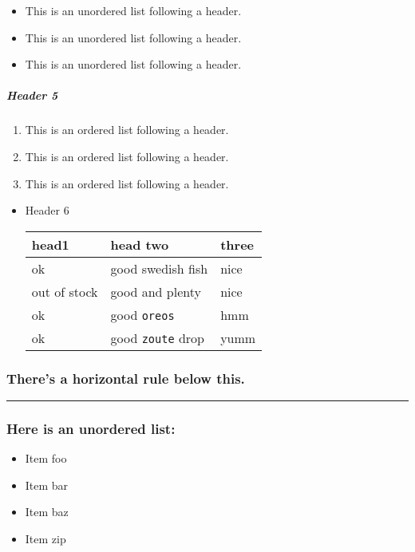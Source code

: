 \documentclass[11pt]{article}
\begin{document}
\begin{itemize}
\item This is an unordered list following a header.
\item This is an unordered list following a header.
\item This is an unordered list following a header.
\end{itemize}

\subparagraph*{Header 5}
\label{sec:orgeca3b1f}

\begin{enumerate}
\item This is an ordered list following a header.
\item This is an ordered list following a header.
\item This is an ordered list following a header.
\end{enumerate}

\begin{itemize}
\item Header 6
\label{sec:org3a69c0d}

\begin{center}
\begin{tabular}{lll}
head1 & head two & three\\[0pt]
\hline
ok & good swedish fish & nice\\[0pt]
out of stock & good and plenty & nice\\[0pt]
ok & good \texttt{oreos} & hmm\\[0pt]
ok & good \texttt{zoute} drop & yumm\\[0pt]
\end{tabular}
\end{center}
\end{itemize}

\subsubsection*{There's a horizontal rule below this.}
\label{sec:org6dca0e2}

\noindent\rule{\textwidth}{0.5pt}

\subsubsection*{Here is an unordered list:}
\label{sec:org5d84cc2}

\begin{itemize}
\item Item foo
\item Item bar
\item Item baz
\item Item zip
\end{itemize}
\end{document}
